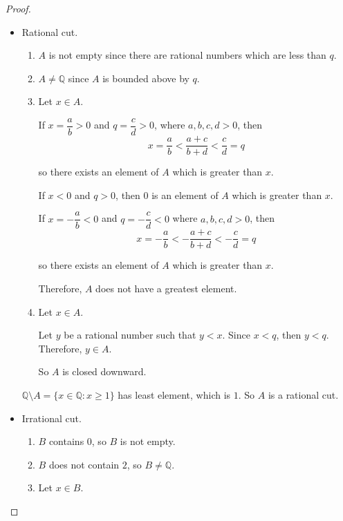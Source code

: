 \begin{proof}
    \begin{itemize}[topsep=0pt]
        \item Rational cut.
              \begin{enumerate}[label={(\roman*)},topsep=0pt]
                  \item $A$ is not empty since there are rational numbers which are less than $q$.
                  \item $A\ne\mathbb{Q}$ since $A$ is bounded above by $q$.
                  \item Let $x\in A$.

                        If $x = \dfrac{a}{b} > 0$ and $q = \dfrac{c}{d} > 0$, where $a, b, c, d > 0$, then
                        \[
                            x = \frac{a}{b} < \frac{a + c}{b + d} < \frac{c}{d} = q
                        \]

                        so there exists an element of $A$ which is greater than $x$.

                        If $x < 0$ and $q > 0$, then $0$ is an element of $A$ which is greater than $x$.

                        If $x = -\dfrac{a}{b} < 0$ and $q = -\dfrac{c}{d} < 0$ where $a, b, c, d > 0$, then
                        \[
                            x = -\frac{a}{b} < -\frac{a + c}{b + d} < -\frac{c}{d} = q
                        \]

                        so there exists an element of $A$ which is greater than $x$.

                        Therefore, $A$ does not have a greatest element.
                  \item Let $x\in A$.

                        Let $y$ be a rational number such that $y < x$. Since $x < q$, then $y < q$. Therefore, $y\in A$.

                        So $A$ is closed downward.
              \end{enumerate}
              $\mathbb{Q}\setminus A = \{ x\in\mathbb{Q}: x\ge 1 \}$ has least element, which is $1$. So $ A$ is a rational cut.
        \item Irrational cut.
              \begin{enumerate}[label={(\roman*)},topsep=0pt]
                  \item $B$ contains $0$, so $B$ is not empty.
                  \item $B$ does not contain $2$, so $B\ne\mathbb{Q}$.
                  \item Let $x\in B$.


\end{enumerate}
\end{itemize}
\end{proof}
